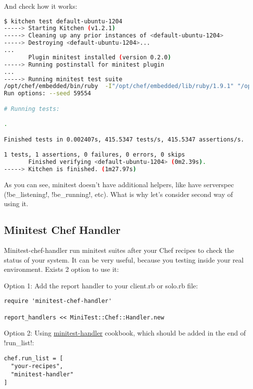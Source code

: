 And check how it works:

\begin{lstlisting}[language=Bash,label=lst:testing-minitest2]
$ kitchen test default-ubuntu-1204
-----> Starting Kitchen (v1.2.1)
-----> Cleaning up any prior instances of <default-ubuntu-1204>
-----> Destroying <default-ubuntu-1204>...
...
       Plugin minitest installed (version 0.2.0)
-----> Running postinstall for minitest plugin
...
-----> Running minitest test suite
/opt/chef/embedded/bin/ruby  -I"/opt/chef/embedded/lib/ruby/1.9.1" "/opt/chef/embedded/lib/ruby/1.9.1/rake/rake_test_loader.rb" "/tmp/busser/suites/minitest/test_default.rb"
Run options: --seed 59554

# Running tests:

.

Finished tests in 0.002407s, 415.5347 tests/s, 415.5347 assertions/s.

1 tests, 1 assertions, 0 failures, 0 errors, 0 skips
       Finished verifying <default-ubuntu-1204> (0m2.39s).
-----> Kitchen is finished. (1m27.97s)
\end{lstlisting}

As you can see, minitest doesn't have additional helpers, like have serverspec (\inline!be_listening!, \inline!be_running!, etc). What is why let's consider second way of using it.

\subsection{Minitest Chef Handler}

Minitest-chef-handler run minitest suites after your Chef recipes to check the status of your system. It can be very useful, because you testing inside your real environment. Exists 2 option to use it:

Option 1: Add the report handler to your client.rb or solo.rb file:

\begin{lstlisting}[label=lst:testing-minitest3]
require 'minitest-chef-handler'

report_handlers << MiniTest::Chef::Handler.new
\end{lstlisting}

Option 2: Using \href{https://github.com/btm/minitest-handler-cookbook}{minitest-handler} cookbook, which should be added in the end of \inline!run_list!:

\begin{lstlisting}[label=lst:testing-minitest4]
chef.run_list = [
  "your-recipes",
  "minitest-handler"
]
\end{lstlisting}

